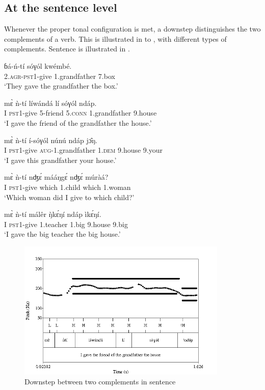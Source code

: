 \documentclass[output=paper,newtxmath,modfonts,nonflat]{langsci/langscibook}
\begin{document}
\subsection{At the sentence level}

Whenever the proper tonal configuration is met, a downstep distinguishes the two complements of a verb. This is illustrated in  to , with different types of complements. Sentence  is illustrated in .

\ea \gll  ɓ{á}-ń-tí sóγól {\textdownstep}kwémbé.\\
2.\textsc{agr}-\textsc{pst1}-give 1.grandfather 7.box\\
\glt `They gave the grandfather the box.'\label{ex:HamlaouiMakasso:7}
\z

\ea \gll m\`ɛ ǹ-tí líw{á}nd{á} lí sóγól {\textdownstep}nd{á}p.\\
I \textsc{pst1}-give 5-friend 5.\textsc{conn} 1.grandfather 9.house\\
\glt `I gave the friend of the grandfather the house.'\label{ex:HamlaouiMakasso:8} 
\z

\ea \gll m\`ɛ ǹ-tí í-{\textdownstep}sóγól núnú {\textdownstep}nd{á}p j\^ɔŋ.\\
I \textsc{pst1}-give \textsc{aug}-1.grandfather  1.\textsc{dem} 9.house 9.your\\
\glt `I gave this grandfather your house.'\label{ex:HamlaouiMakasso:9}
\z

\ea \gll  m\`ɛ ǹ-tí nʤ\'ɛ m{á}{á}ŋg\'ɛ {\textdownstep}nʤ\'ɛ múrà{á}?\\
I \textsc{pst1}-give which 1.child which 1.woman\\
\glt `Which woman did I give to which child?'\label{ex:HamlaouiMakasso:10}
\z

\ea \gll  m\`ɛ ǹ-tí m{á}lêr \`ŋk\'ɛŋí {\textdownstep}nd{á}p ìk\'ɛŋí.\\
I \textsc{pst1}-give 1.teacher 1.big 9.house 9.big\\
\glt `I gave the big teacher the big house.'\label{ex:HamlaouiMakasso:11}
\z

\begin{figure}

\caption{Downstep between two complements in sentence  \label{fig:HamlaouiMakasso:5}}
\includegraphics[width=10cm]{figures/ComplexO1Sept16B}

\end{figure}
\end{document}
